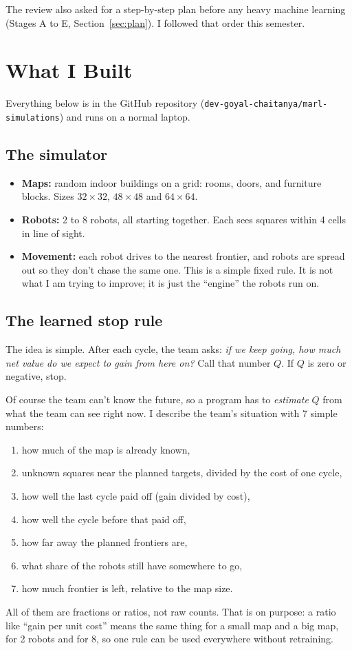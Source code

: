 \documentclass[11pt,a4paper]{article}
\begin{document}
The review also asked for a step-by-step plan before any heavy machine learning (Stages A to E, Section~\ref{sec:plan}). I followed that order this semester.

\section{What I Built}

Everything below is in the GitHub repository (\texttt{dev-goyal-chaitanya/marl-simulations}) and runs on a normal laptop.

\subsection{The simulator}
\begin{itemize}
  \item \textbf{Maps:} random indoor buildings on a grid: rooms, doors, and furniture blocks. Sizes $32\times32$, $48\times48$ and $64\times64$.
  \item \textbf{Robots:} 2 to 8 robots, all starting together. Each sees squares within 4 cells in line of sight.
  \item \textbf{Movement:} each robot drives to the nearest frontier, and robots are spread out so they don't chase the same one. This is a simple fixed rule. It is not what I am trying to improve; it is just the ``engine'' the robots run on.
\end{itemize}

\subsection{The learned stop rule}

The idea is simple. After each cycle, the team asks: \emph{if we keep going, how much net value do we expect to gain from here on?} Call that number $Q$. If $Q$ is zero or negative, stop.

Of course the team can't know the future, so a program has to \emph{estimate} $Q$ from what the team can see right now. I describe the team's situation with 7 simple numbers:
\begin{enumerate}
  \item how much of the map is already known,
  \item unknown squares near the planned targets, divided by the cost of one cycle,
  \item how well the last cycle paid off (gain divided by cost),
  \item how well the cycle before that paid off,
  \item how far away the planned frontiers are,
  \item what share of the robots still have somewhere to go,
  \item how much frontier is left, relative to the map size.
\end{enumerate}
All of them are fractions or ratios, not raw counts. That is on purpose: a ratio like ``gain per unit cost'' means the same thing for a small map and a big map, for 2 robots and for 8, so one rule can be used everywhere without retraining.
\end{document}
